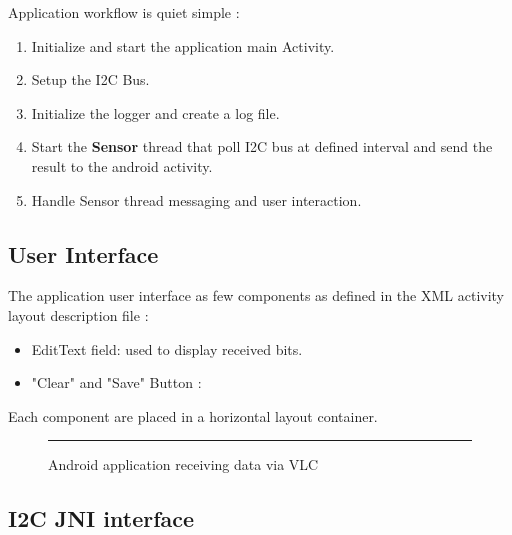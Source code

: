 Application workflow is quiet simple :
\begin{enumerate}
\item Initialize and start the application main Activity.
\item Setup the I2C Bus.
\item Initialize the logger and create a log file.
\item Start the \textbf{Sensor} thread that poll I2C bus at defined interval and send the result to the android activity. 
\item Handle Sensor thread messaging and user interaction.
\end{enumerate}

\subsection{User Interface}

The application user interface as few components as defined in the XML activity layout description file :
\begin{itemize}
\item EditText field: used to display received bits.
\item "Clear" and "Save" Button :
\end{itemize}

Each component are placed in a horizontal layout container.

\begin{figure}[htbp]
    \centering
    \rule{35em}{0.5pt}
    \caption{Android application receiving data via VLC}
    \label{fig:androidapp}
\end{figure}

\subsection{I2C JNI interface}

